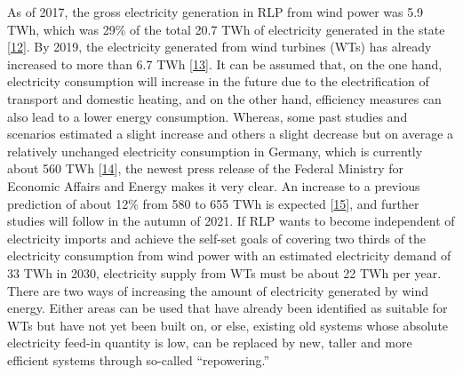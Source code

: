\documentclass[a4paper,11pt]{article}
\begin{document}
As of 2017, the gross electricity generation in RLP from wind power was 5.9 TWh, which was 29\% of the total 20.7 TWh of electricity generated in the state {[}\protect\hyperlink{ref-Lehnert.2020}{12}{]}. By 2019, the electricity generated from wind turbines (WTs) has already increased to more than 6.7 TWh {[}\protect\hyperlink{ref-AmprionGmbH.2019}{13}{]}. It can be assumed that, on the one hand, electricity consumption will increase in the future due to the electrification of transport and domestic heating, and on the other hand, efficiency measures can also lead to a lower energy consumption. Whereas, some past studies and scenarios estimated a slight increase and others a slight decrease but on average a relatively unchanged electricity consumption in Germany, which is currently about 560 TWh {[}\protect\hyperlink{ref-NormanGerhardt.2015}{14}{]}, the newest press release of the Federal Ministry for Economic Affairs and Energy makes it very clear. An increase to a previous prediction of about 12\% from 580 to 655 TWh is expected {[}\protect\hyperlink{ref-AndreasMertens.13.07.2021}{15}{]}, and further studies will follow in the autumn of 2021. If RLP wants to become independent of electricity imports and achieve the self-set goals of covering two thirds of the electricity consumption from wind power with an estimated electricity demand of 33 TWh in 2030, electricity supply from WTs must be about 22 TWh per year. There are two ways of increasing the amount of electricity generated by wind energy. Either areas can be used that have already been identified as suitable for WTs but have not yet been built on, or else, existing old systems whose absolute electricity feed-in quantity is low, can be replaced by new, taller and more efficient systems through so-called ``repowering.''
\end{document}
